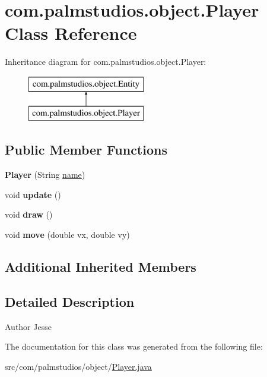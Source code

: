 \hypertarget{classcom_1_1palmstudios_1_1object_1_1_player}{}\section{com.\+palmstudios.\+object.\+Player Class Reference}
\label{classcom_1_1palmstudios_1_1object_1_1_player}
Inheritance diagram for com.\+palmstudios.\+object.\+Player\+:\begin{figure}[H]
\begin{center}
\leavevmode
\includegraphics[height=2.000000cm]{classcom_1_1palmstudios_1_1object_1_1_player}
\end{center}
\end{figure}
\subsection*{Public Member Functions}
\begin{DoxyCompactItemize}
\item 
\mbox{\label{classcom_1_1palmstudios_1_1object_1_1_player_a397dba9a0acfa65a16ac593c1a2c486b}} 
{\bfseries Player} (String \hyperlink{classcom_1_1palmstudios_1_1object_1_1_entity_ad1dd4b4b3fd94cdd50041ed527a15f06}{name})
\item 
\mbox{\label{classcom_1_1palmstudios_1_1object_1_1_player_a341b02463b8b578c4d489b04d61cafc9}} 
void {\bfseries update} ()
\item 
\mbox{\label{classcom_1_1palmstudios_1_1object_1_1_player_a065cf164c1d3def613398942e691b50c}} 
void {\bfseries draw} ()
\item 
\mbox{\label{classcom_1_1palmstudios_1_1object_1_1_player_a4a53f6c1a1aa4d6e4a1e2da17f0bf4ad}} 
void {\bfseries move} (double vx, double vy)
\end{DoxyCompactItemize}
\subsection*{Additional Inherited Members}


\subsection{Detailed Description}
\begin{DoxyAuthor}{Author}
Jesse 
\end{DoxyAuthor}


The documentation for this class was generated from the following file\+:\begin{DoxyCompactItemize}
\item 
src/com/palmstudios/object/\hyperlink{_player_8java}{Player.\+java}\end{DoxyCompactItemize}
